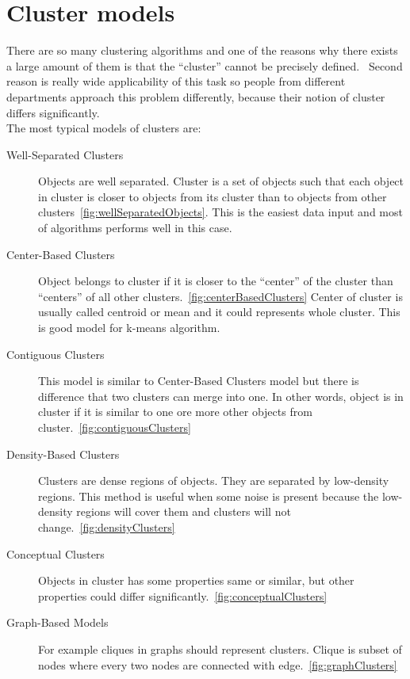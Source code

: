 \section{Cluster models} \label{sec:clustermodels}
There are so many clustering algorithms and one of the reasons why there exists a large amount of them is that the ``cluster'' cannot be precisely defined.~\cite{EstivillCastro02} Second reason is really wide applicability of this task so people from different departments approach this problem differently, because their notion of cluster differs significantly. \\
The most typical models of clusters are:
\begin{description}
\item[Well-Separated Clusters] Objects are well separated. Cluster is a set of objects such that each object in cluster is closer to objects from its cluster than to objects from other clusters~\ref{fig:wellSeparatedObjects}. This is the easiest data input and most of algorithms performs well in this case.

\item[Center-Based Clusters] Object belongs to cluster if it is closer to the ``center'' of the cluster than ``centers'' of all other clusters.~\ref{fig:centerBasedClusters} Center of cluster is usually called centroid or mean and it could represents whole cluster. This is good model for k-means algorithm.

\item[Contiguous Clusters] This model is similar to Center-Based Clusters model but there is difference that two clusters can merge into one. In other words, object is in cluster if it is similar to one ore more other objects from cluster.~\ref{fig:contiguousClusters}

\item[Density-Based Clusters] Clusters are dense regions of objects. They are separated by low-density regions. This method is useful when some noise is present because the low-density regions will cover them and clusters will not change.~\ref{fig:densityClusters}

\item[Conceptual Clusters] Objects in cluster has some properties same or similar, but other properties could differ significantly.~\ref{fig:conceptualClusters}

\item[Graph-Based Models] For example cliques in graphs should represent clusters. Clique is subset of nodes where every two nodes are connected with edge.~\ref{fig:graphClusters}
\end{description}

